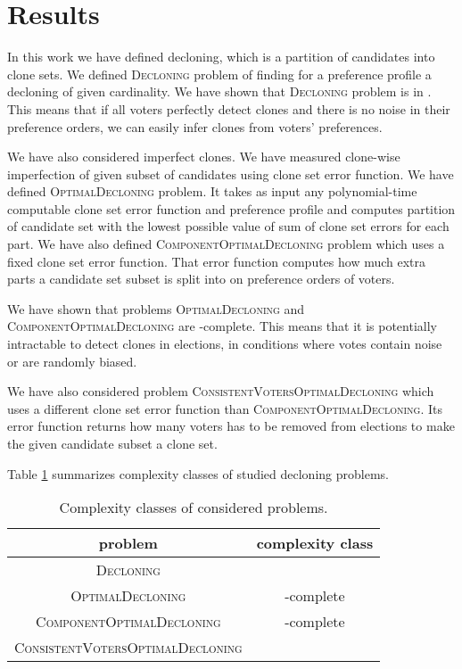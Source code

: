\section{Results}

In this work we have defined decloning, which is a partition of candidates into clone sets.
We defined \textsc{Decloning} problem of finding for a preference profile a decloning of given cardinality.
We have shown that \textsc{Decloning} problem is in \p.
This means that if all voters perfectly detect clones
and there is no noise in their preference orders,
we can easily infer clones from voters' preferences.

We have also considered imperfect clones.
We have measured clone-wise imperfection of given subset of candidates using clone set error function.
We have defined \textsc{OptimalDecloning} problem.
It takes as input any polynomial-time computable clone set error function and preference profile
and computes partition of candidate set with the lowest possible value of sum of clone set errors for each part.
We have also defined \textsc{ComponentOptimalDecloning} problem which uses a fixed clone set error function.
That error function computes how much extra parts a candidate set subset is split into
on preference orders of voters.

We have shown that problems \textsc{OptimalDecloning} and \textsc{ComponentOptimalDecloning}
are \np-complete.
This means that it is potentially intractable to detect clones in elections,
in conditions where votes contain noise or are randomly biased.

We have also considered problem \textsc{ConsistentVotersOptimalDecloning}
which uses a different clone set error function than \textsc{ComponentOptimalDecloning}.
Its error function returns how many voters has to be removed from elections
to make the given candidate subset a clone set.

Table \ref{cclasses} summarizes complexity classes of studied decloning problems.

\begin{table}
\centering
\begin{tabular}{| c | c |}\hline
	\textbf{problem} & \textbf{complexity class} \\ \hline
	\textsc{Decloning} & \p \\ \hline
	\textsc{OptimalDecloning} & \np-complete \\ \hline
	\textsc{ComponentOptimalDecloning} & \np-complete \\ \hline
	\textsc{ConsistentVotersOptimalDecloning} & \np \\ \hline
\end{tabular}
\caption{Complexity classes of considered problems.} \label{cclasses}
\end{table}



